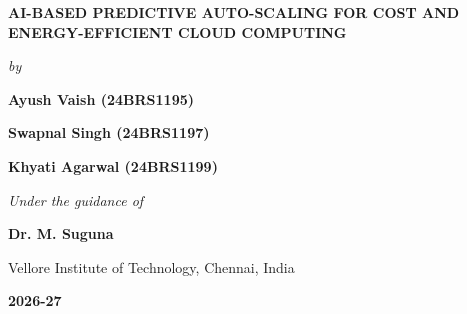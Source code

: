 \documentclass[10pt,journal,compsoc]{IEEEtran}
\begin{document}
\begin{titlepage}
\centering
\vspace*{1.5cm}

{\Large \textbf{AI-BASED PREDICTIVE AUTO-SCALING FOR COST AND ENERGY-EFFICIENT CLOUD COMPUTING}\par}
\vspace{1.5cm}

{\large \textit{by}\par}
\vspace{0.8cm}

{\large \textbf{Ayush Vaish (24BRS1195)}\par}
\vspace{0.2cm}
{\large \textbf{Swapnal Singh (24BRS1197)}\par}
\vspace{0.2cm}
{\large \textbf{Khyati Agarwal (24BRS1199)}\par}
\vspace{2cm}

{\large \textit{Under the guidance of}\par}
\vspace{0.5cm}
{\Large \textbf{Dr. M. Suguna}\par}
\vspace{0.3cm}
{\large Vellore Institute of Technology, Chennai, India\par}
\vspace{2.5cm}

\begin{center}
\end{center}

\vfill
{\Large \textbf{2026-27}\par}
\vspace*{1cm}
\end{titlepage}

\clearpage

\end{document}
